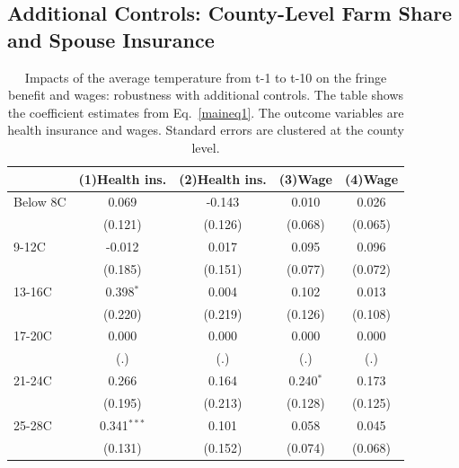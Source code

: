\documentclass[12pt]{article}
\newcommand{\sym}[1]{\ensuremath{^{#1}}}
\begin{document}
\begin{appendices}
\subsection{Additional Controls: County-Level Farm Share and Spouse Insurance}
\begin{table}[h!]
\caption{Impacts of the average temperature from t-1 to t-10 on the fringe benefit and wages: robustness with additional controls. The table shows the coefficient estimates from Eq.~\ref{maineq1}. The outcome variables are health insurance and wages. Standard errors are clustered at the county level.}
\label{tab:robustness_controls}
\centering
\scriptsize
\begin{tabular}{l*{4}{c}}
\hline\hline
                    &\multicolumn{1}{c}{(1)Health ins.}&\multicolumn{1}{c}{(2)Health ins.}&\multicolumn{1}{c}{(3)Wage}&\multicolumn{1}{c}{(4)Wage}\\
\hline
Below 8C            &       0.069         &      -0.143         &       0.010         &       0.026         \\
                    &     (0.121)         &     (0.126)         &     (0.068)         &     (0.065)         \\
9-12C               &      -0.012         &       0.017         &       0.095         &       0.096         \\
                    &     (0.185)         &     (0.151)         &     (0.077)         &     (0.072)         \\
13-16C              &       0.398\sym{*}  &       0.004         &       0.102         &       0.013         \\
                    &     (0.220)         &     (0.219)         &     (0.126)         &     (0.108)         \\
17-20C              &       0.000         &       0.000         &       0.000         &       0.000         \\
                    &         (.)         &         (.)         &         (.)         &         (.)         \\
21-24C              &       0.266         &       0.164         &       0.240\sym{*}  &       0.173         \\
                    &     (0.195)         &     (0.213)         &     (0.128)         &     (0.125)         \\
25-28C              &       0.341\sym{***}&       0.101         &       0.058         &       0.045         \\
                    &     (0.131)         &     (0.152)         &     (0.074)         &     (0.068)         \\

\end{tabular}
\end{table}
\end{appendices}
\end{document}
